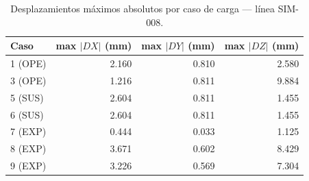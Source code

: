 \begin{table}[htbp]
  \centering
  \small
  \caption{Desplazamientos máximos absolutos por caso de carga — línea SIM-008.}
  \label{tab:desplaz-max}
  \begin{tabular}{lrrr}
    \toprule
    Caso & max $|DX|$ (\si{mm}) & max $|DY|$ (\si{mm}) & max $|DZ|$ (\si{mm}) \\
    \midrule
    1 (OPE) & 2.160 & 0.810 & 2.580 \\
    3 (OPE) & 1.216 & 0.811 & 9.884 \\
    5 (SUS) & 2.604 & 0.811 & 1.455 \\
    6 (SUS) & 2.604 & 0.811 & 1.455 \\
    7 (EXP) & 0.444 & 0.033 & 1.125 \\
    8 (EXP) & 3.671 & 0.602 & 8.429 \\
    9 (EXP) & 3.226 & 0.569 & 7.304 \\
    \bottomrule
  \end{tabular}
\end{table}
